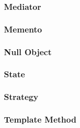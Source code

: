 \documentclass[a4paper]{article}
\begin{document}
\subsubsection{Mediator}

\subsubsection{Memento}

\subsubsection{Null Object}

\subsubsection{State}

\subsubsection{Strategy}

\subsubsection{Template Method}
\end{document}
